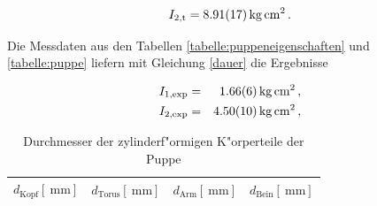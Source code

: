 				\begin{equation*}
					I_{2,\mathrm{t}} = \SI{8.91 (17)}{\kilo \gram \centi \meter \squared} \,.
				\end{equation*}

				Die Messdaten aus den Tabellen \ref{tabelle:puppeneigenschaften} und \ref{tabelle:puppe} liefern mit Gleichung \eqref{dauer} die Ergebnisse

				\begin{eqnarray*}
					I_{1, \mathrm{exp}} & = & \SI{1.66 (6)}{\kilo \gram \centi \meter \squared} \,, \\
					I_{2,\mathrm{exp}} & = & \SI{4.50 (10)}{\kilo \gram \centi \meter \squared} \,, \\
				\end{eqnarray*}

				\clearpage

				\begin{table}[h!]
					\begin{center}
						\caption{Durchmesser der zylinderf"ormigen K"orperteile der Puppe \label{tabelle:puppenradien}}
						\begin{tabular}{|c|c|c|c|}
							\hline
							$d_\mathrm{Kopf} [\SI{}{\milli \meter}]$ & $d_\mathrm{Torus} [\SI{}{\milli \meter}]$ & $d_\mathrm{Arm} [\SI{}{\milli \meter}]$ & $d_\mathrm{Bein} [\SI{}{\milli \meter}]$ \\
							\hline 
							\hline
							
							\hline 
						\end{tabular}
					\end{center}
					
				\end{table}

